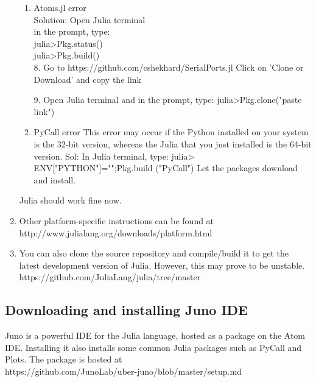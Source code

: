 \begin{enumerate}
\begin{enumerate}
      \item Atoms.jl error\\
            Solution: Open Julia terminal\\
            in the prompt, type:\\
            julia>Pkg.status()\\
            julia>Pkg.build()\\
            8. Go to https://github.com/cshekhard/SerialPorts.jl
            Click on 'Clone or Download' and copy the link
            
            9. Open Julia terminal and in the prompt, type:
            julia>Pkg.clone("paste link")
            
      \item PyCall error
            This error may occur if the Python installed on your system is the 32-bit version, whereas the Julia that you just installed is the 64-bit version.
            Sol: In Julia terminal, type:
            julia> ENV["PYTHON"]="";Pkg.build ("PyCall")
            Let the packages download and install.
\end{enumerate}

Julia should work fine now.


\item Other platform-specific instructions can be found at \\ 
http://www.julialang.org/downloads/platform.html 

\item You can also clone the source repository and compile/build it to get the  
latest development version of Julia. However, this may prove to be unstable.
https://github.com/JuliaLang/julia/tree/master 

\end {enumerate}

\subsection{Downloading and installing Juno IDE}\label{juno-ide-installation}

Juno is a powerful IDE for the Julia language, hosted as a package on the Atom IDE. Installing it also installs some common Julia packages such as PyCall and Plots. The package is hosted at \\
https://github.com/JunoLab/uber-juno/blob/master/setup.md 


